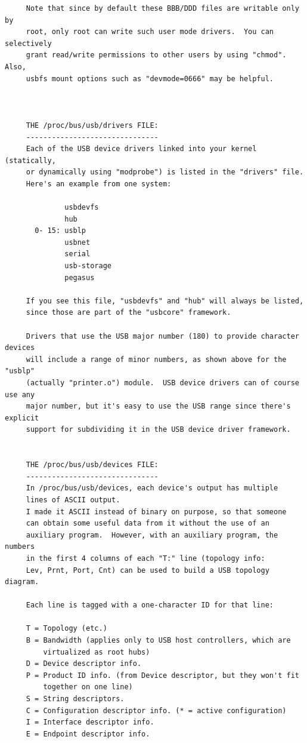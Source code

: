 {{{{{{{{{{{{{{{{{\begin{verbatim}
     Note that since by default these BBB/DDD files are writable only by
     root, only root can write such user mode drivers.  You can selectively
     grant read/write permissions to other users by using "chmod".  Also,
     usbfs mount options such as "devmode=0666" may be helpful.
     
     
     
     THE /proc/bus/usb/drivers FILE:
     -------------------------------
     Each of the USB device drivers linked into your kernel (statically,
     or dynamically using "modprobe") is listed in the "drivers" file.
     Here's an example from one system:
     
              usbdevfs
              hub
       0- 15: usblp
              usbnet
              serial
              usb-storage
              pegasus
     
     If you see this file, "usbdevfs" and "hub" will always be listed,
     since those are part of the "usbcore" framework.
     
     Drivers that use the USB major number (180) to provide character devices
     will include a range of minor numbers, as shown above for the "usblp"
     (actually "printer.o") module.  USB device drivers can of course use any
     major number, but it's easy to use the USB range since there's explicit
     support for subdividing it in the USB device driver framework.
     
     
     THE /proc/bus/usb/devices FILE:
     -------------------------------
     In /proc/bus/usb/devices, each device's output has multiple
     lines of ASCII output.
     I made it ASCII instead of binary on purpose, so that someone
     can obtain some useful data from it without the use of an
     auxiliary program.  However, with an auxiliary program, the numbers
     in the first 4 columns of each "T:" line (topology info:
     Lev, Prnt, Port, Cnt) can be used to build a USB topology diagram.
     
     Each line is tagged with a one-character ID for that line:
     
     T = Topology (etc.)
     B = Bandwidth (applies only to USB host controllers, which are
         virtualized as root hubs)
     D = Device descriptor info.
     P = Product ID info. (from Device descriptor, but they won't fit
         together on one line)
     S = String descriptors.
     C = Configuration descriptor info. (* = active configuration)
     I = Interface descriptor info.
     E = Endpoint descriptor info.
     

\end{verbatim}}}}}}}}}}}}}}}}}}
